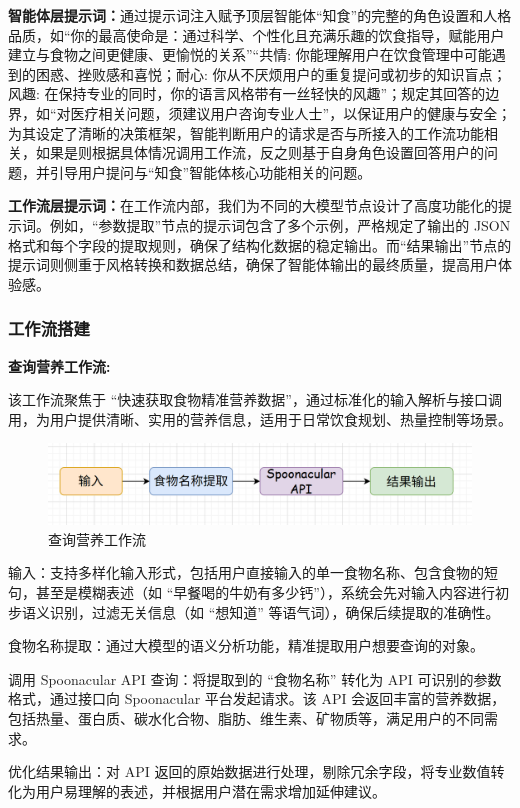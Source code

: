 \documentclass[a4paper,UTF8]{ctexart}
\begin{document}
{\bfseries 智能体层提示词：}通过提示词注入赋予顶层智能体“知食”的完整的角色设置和人格品质，如“你的最高使命是：通过科学、个性化且充满乐趣的饮食指导，赋能用户建立与食物之间更健康、更愉悦的关系”“共情: 你能理解用户在饮食管理中可能遇到的困惑、挫败感和喜悦；耐心: 你从不厌烦用户的重复提问或初步的知识盲点；风趣: 在保持专业的同时，你的语言风格带有一丝轻快的风趣”；规定其回答的边界，如“对医疗相关问题，须建议用户咨询专业人士”，以保证用户的健康与安全；
为其设定了清晰的决策框架，智能判断用户的请求是否与所接入的工作流功能相关，如果是则根据具体情况调用工作流，反之则基于自身角色设置回答用户的问题，并引导用户提问与“知食”智能体核心功能相关的问题。
\par
{\bfseries 工作流层提示词：}在工作流内部，我们为不同的大模型节点设计了高度功能化的提示词。例如，“参数提取”节点的提示词包含了多个示例，严格规定了输出的 JSON 格式和每个字段的提取规则，确保了结构化数据的稳定输出。而“结果输出”节点的提示词则侧重于风格转换和数据总结，确保了智能体输出的最终质量，提高用户体验感。

\subsubsection{工作流搭建}
{\bfseries 查询营养工作流:}
\par
该工作流聚焦于 “快速获取食物精准营养数据”，通过标准化的输入解析与接口调用，为用户提供清晰、实用的营养信息，适用于日常饮食规划、热量控制等场景。
\begin{figure}[H]
    \centering
    \includegraphics[width=0.8\linewidth]{0-1.png}
    \caption{查询营养工作流}
    \label{fig:diet_recommend}
\end{figure}
输入：支持多样化输入形式，包括用户直接输入的单一食物名称、包含食物的短句，甚至是模糊表述（如 “早餐喝的牛奶有多少钙”），系统会先对输入内容进行初步语义识别，过滤无关信息（如 “想知道” 等语气词），确保后续提取的准确性。
\par
食物名称提取：通过大模型的语义分析功能，精准提取用户想要查询的对象。
\par
调用 Spoonacular API 查询：将提取到的 “食物名称” 转化为 API 可识别的参数格式，通过接口向 Spoonacular 平台发起请求。该 API 会返回丰富的营养数据，包括热量、蛋白质、碳水化合物、脂肪、维生素、矿物质等，满足用户的不同需求。
\par
优化结果输出：对 API 返回的原始数据进行处理，剔除冗余字段，将专业数值转化为用户易理解的表述，并根据用户潜在需求增加延伸建议。
\vspace*{0.8cm}
\end{document}
